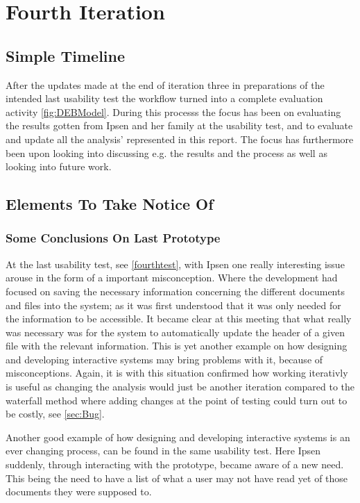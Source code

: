 \section{Fourth Iteration}
\subsection{Simple Timeline}\label{sec:3Iteration-timeline}
After the updates made at the end of iteration three in preparations of the intended last usability test the workflow turned into a complete evaluation activity \cref{fig:DEBModel}.
During this processs the focus has been on evaluating the results gotten from Ipsen and her family at the usability test, and to evaluate and update all the analysis' represented in this report.
The focus has furthermore been upon looking into discussing e.g. the results and the process as well as looking into future work.

\subsection{Elements To Take Notice Of}\label{sec:4notice}
\subsubsection*{Some Conclusions On Last Prototype}
At the last usability test, see \cref{fourthtest}, with Ipsen one really interesting issue arouse in the form of a important misconception.
Where the development had focused on saving the necessary information concerning the different documents and files into the system; as it was first understood that it was only needed for the information to be accessible.
It became clear at this meeting that what really was necessary was for the system to automatically update the header of a given file  with the relevant information.
This is yet another example on how designing and developing interactive systems may bring problems with it, because of misconceptions.
Again, it is with this situation confirmed how working iterativly is useful as changing the analysis would just be another iteration compared to the waterfall method where adding changes at the point of testing could turn out to be costly, see \cref{sec:Bug}.

Another good example of how designing and developing interactive systems is an ever changing process, can be found in the same usability test.
Here Ipsen suddenly, through interacting with the prototype, became aware of a new need.
This being the need to have a list of what a user may not have read yet of those documents they were supposed to.

